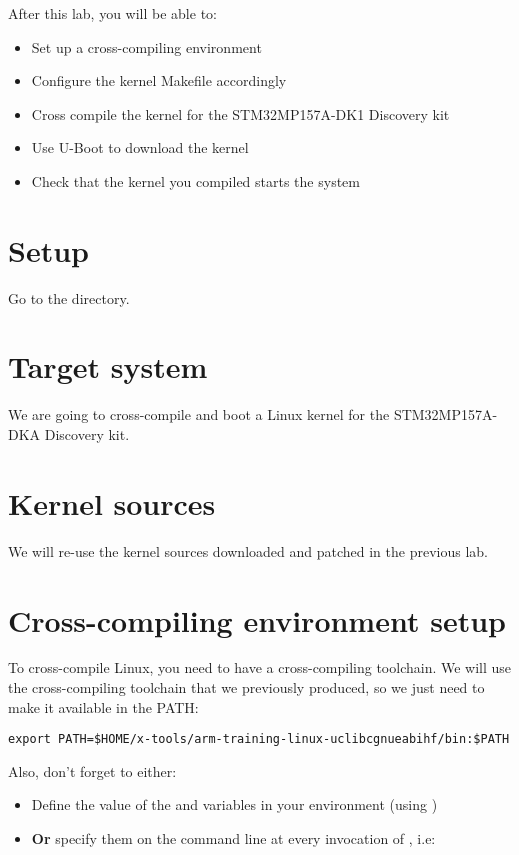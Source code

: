 
After this lab, you will be able to:
\begin{itemize}
\item Set up a cross-compiling environment
\item Configure the kernel Makefile accordingly
\item Cross compile the kernel for the STM32MP157A-DK1 Discovery kit
\item Use U-Boot to download the kernel
\item Check that the kernel you compiled starts the system
\end{itemize}

\section{Setup}

Go to the  directory.

\section{Target system}

We are going to cross-compile and boot a Linux kernel for the
STM32MP157A-DKA Discovery kit.

\section{Kernel sources}

We will re-use the kernel sources downloaded and patched in the
previous lab.

\section{Cross-compiling environment setup}

To cross-compile Linux, you need to have a cross-compiling
toolchain. We will use the cross-compiling toolchain that we
previously produced, so we just need to make it available in the PATH:

\begin{verbatim}
export PATH=$HOME/x-tools/arm-training-linux-uclibcgnueabihf/bin:$PATH
\end{verbatim}

Also, don't forget to either:

\begin{itemize}
\item Define the value of the  and 
  variables in your environment (using )
\item {\bf Or} specify them on the command line at every invocation of
  , i.e: 
\end{itemize}

